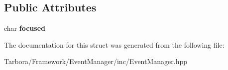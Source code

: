 \subsection*{Public Attributes}
\begin{DoxyCompactItemize}
\item 
\mbox{\label{structTarbora_1_1WindowFocusEvent_a661c6ef496bfeadc8d04d7c9acc9dc5b}} 
char {\bfseries focused}
\end{DoxyCompactItemize}


The documentation for this struct was generated from the following file\+:\begin{DoxyCompactItemize}
\item 
Tarbora/\+Framework/\+Event\+Manager/inc/Event\+Manager.\+hpp\end{DoxyCompactItemize}
